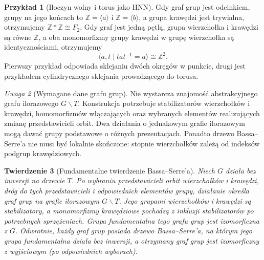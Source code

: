 \documentclass[11pt,a4paper]{report}
\numberwithin{equation}{section}
\theoremstyle{plain}
\newtheorem{twierdzenie}{Twierdzenie}[section]
\theoremstyle{definition}
\newtheorem{przyklad}[twierdzenie]{Przykład}
\theoremstyle{remark}
\newtheorem{uwaga}[twierdzenie]{Uwaga}
\begin{document}
\begin{przyklad}[Iloczyn wolny i torus jako HNN]
Gdy graf grup jest odcinkiem, grupy na jego końcach to
$\mathbb Z=\langle a\rangle$ i
$\mathbb Z=\langle b\rangle$, a grupa krawędzi jest
trywialna, otrzymujemy $\mathbb Z*\mathbb Z\cong F_2$.
Gdy graf jest jedną pętlą, grupa wierzchołka i krawędzi
są równe $\mathbb Z$, a oba monomorfizmy grupy krawędzi
w grupę wierzchołka są identycznościami, otrzymujemy
\[
\langle a,t\mid tat^{-1}=a\rangle\cong\mathbb Z^2.
\]
Pierwszy przykład odpowiada sklejaniu dwóch okręgów
w punkcie, drugi jest przykładem cylindrycznego
sklejania prowadzącego do torusa.
\end{przyklad}

\begin{center}
\end{center}

\begin{uwaga}[Wymagane dane grafu grup]
Nie wystarcza znajomość abstrakcyjnego grafu ilorazowego
$G\backslash T$. Konstrukcja potrzebuje stabilizatorów
wierzchołków i krawędzi, homomorfizmów włączających oraz
wybranych elementów realizujących zmianę przedstawicieli orbit.
Dwa działania o jednakowym grafie ilorazowym mogą dawać
grupy podstawowe o różnych prezentacjach.
Ponadto drzewo Bassa--Serre'a nie musi być lokalnie skończone:
stopnie wierzchołków zależą od indeksów podgrup krawędziowych.
\end{uwaga}

\begin{twierdzenie}[Fundamentalne twierdzenie Bassa--Serre'a]
Niech $G$ działa bez inwersji na drzewie $T$.
Po wybraniu przedstawicieli orbit wierzchołków i krawędzi,
dróg do tych przedstawicieli i odpowiednich elementów grupy,
działanie określa graf grup na grafie ilorazowym
$G\backslash T$. Jego grupami wierzchołków i krawędzi
są stabilizatory, a monomorfizmy krawędziowe pochodzą
z inkluzji stabilizatorów po potrzebnych sprzężeniach. Grupa fundamentalna tego
grafu grup jest izomorficzna z $G$. Odwrotnie, każdy graf
grup posiada drzewo Bassa--Serre'a, na którym jego grupa
fundamentalna działa bez inwersji, a otrzymany graf grup
jest izomorficzny z wyjściowym (po odpowiednich wyborach).
\end{twierdzenie}
\end{document}
